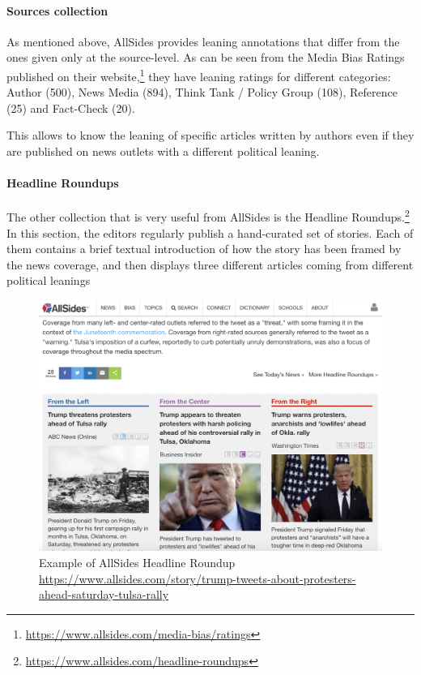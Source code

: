 \paragraph{Sources collection}

As mentioned above, AllSides provides leaning annotations that differ from  the ones given only at the source-level.
As can be seen from the Media Bias Ratings published on their website,\footnote{\url{https://www.allsides.com/media-bias/ratings}} they have leaning ratings for different categories: Author (500), News Media (894), Think Tank / Policy Group (108), Reference (25) and Fact-Check (20).

This allows to know the leaning of specific articles written by authors even if they are published on news outlets with a different political leaning. 


\paragraph{Headline Roundups\texttrademark}

The other collection that is very useful from AllSides is the Headline Roundups\texttrademark.\footnote{\url{https://www.allsides.com/headline-roundups}} In this section, the editors regularly publish a hand-curated set of stories. Each of them contains a brief textual introduction of how the story has been framed by the news coverage, and then displays three different articles coming from different political leanings


\begin{figure}[!htb]
    \centering
    \includegraphics[width=\linewidth]{figures/allsides.png}
    \caption{Example of AllSides Headline Roundup \url{https://www.allsides.com/story/trump-tweets-about-protesters-ahead-saturday-tulsa-rally}}
    \label{fig:allsides}
\end{figure}


